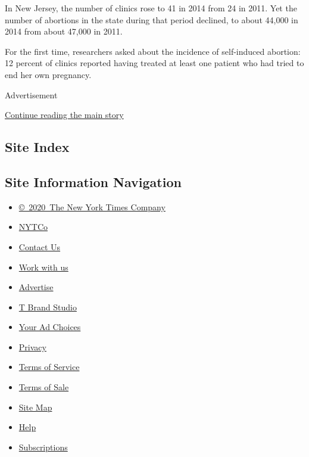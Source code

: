 In New Jersey, the number of clinics rose to 41 in 2014 from 24 in 2011.
Yet the number of abortions in the state during that period declined, to
about 44,000 in 2014 from about 47,000 in 2011.

For the first time, researchers asked about the incidence of
self-induced abortion: 12 percent of clinics reported having treated at
least one patient who had tried to end her own pregnancy.

Advertisement

\protect\hyperlink{after-bottom}{Continue reading the main story}

\hypertarget{site-index}{%
\subsection{Site Index}\label{site-index}}

\hypertarget{site-information-navigation}{%
\subsection{Site Information
Navigation}\label{site-information-navigation}}

\begin{itemize}
\tightlist
\item
  \href{https://help.nytimes3xbfgragh.onion/hc/en-us/articles/115014792127-Copyright-notice}{©~2020~The
  New York Times Company}
\end{itemize}

\begin{itemize}
\tightlist
\item
  \href{https://www.nytco.com/}{NYTCo}
\item
  \href{https://help.nytimes3xbfgragh.onion/hc/en-us/articles/115015385887-Contact-Us}{Contact
  Us}
\item
  \href{https://www.nytco.com/careers/}{Work with us}
\item
  \href{https://nytmediakit.com/}{Advertise}
\item
  \href{http://www.tbrandstudio.com/}{T Brand Studio}
\item
  \href{https://www.nytimes3xbfgragh.onion/privacy/cookie-policy\#how-do-i-manage-trackers}{Your
  Ad Choices}
\item
  \href{https://www.nytimes3xbfgragh.onion/privacy}{Privacy}
\item
  \href{https://help.nytimes3xbfgragh.onion/hc/en-us/articles/115014893428-Terms-of-service}{Terms
  of Service}
\item
  \href{https://help.nytimes3xbfgragh.onion/hc/en-us/articles/115014893968-Terms-of-sale}{Terms
  of Sale}
\item
  \href{https://spiderbites.nytimes3xbfgragh.onion}{Site Map}
\item
  \href{https://help.nytimes3xbfgragh.onion/hc/en-us}{Help}
\item
  \href{https://www.nytimes3xbfgragh.onion/subscription?campaignId=37WXW}{Subscriptions}
\end{itemize}
